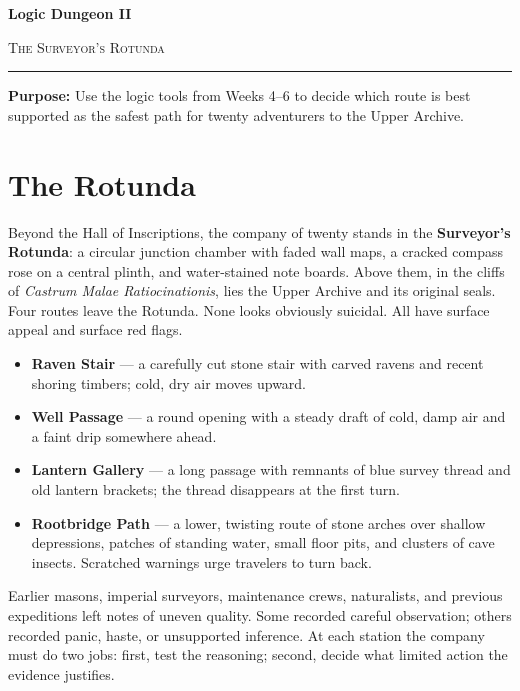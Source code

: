 \documentclass[12pt]{article}
\begin{document}
\begin{center}
{\LARGE\bfseries Logic Dungeon II}\par\vspace{0.04em}
{\large\scshape The Surveyor's Rotunda}\par\vspace{0.08em}
\rule{0.78\textwidth}{0.5pt}\par
\end{center}
\textbf{Purpose:} Use the logic tools from Weeks 4--6 to decide which route is best supported as the safest path for twenty adventurers to the Upper Archive.

\section*{The Rotunda}
Beyond the Hall of Inscriptions, the company of twenty stands in the \textbf{Surveyor's Rotunda}: a circular junction chamber with faded wall maps, a cracked compass rose on a central plinth, and water-stained note boards. Above them, in the cliffs of \textit{Castrum Malae Ratiocinationis}, lies the Upper Archive and its original seals. Four routes leave the Rotunda. None looks obviously suicidal. All have surface appeal and surface red flags.

\begin{itemize}[leftmargin=1.5em,itemsep=0.08em]
\item \textbf{Raven Stair} --- a carefully cut stone stair with carved ravens and recent shoring timbers; cold, dry air moves upward.
\item \textbf{Well Passage} --- a round opening with a steady draft of cold, damp air and a faint drip somewhere ahead.
\item \textbf{Lantern Gallery} --- a long passage with remnants of blue survey thread and old lantern brackets; the thread disappears at the first turn.
\item \textbf{Rootbridge Path} --- a lower, twisting route of stone arches over shallow depressions, patches of standing water, small floor pits, and clusters of cave insects. Scratched warnings urge travelers to turn back.
\end{itemize}

Earlier masons, imperial surveyors, maintenance crews, naturalists, and previous expeditions left notes of uneven quality. Some recorded careful observation; others recorded panic, haste, or unsupported inference. At each station the company must do two jobs: first, test the reasoning; second, decide what limited action the evidence justifies.
\end{document}
